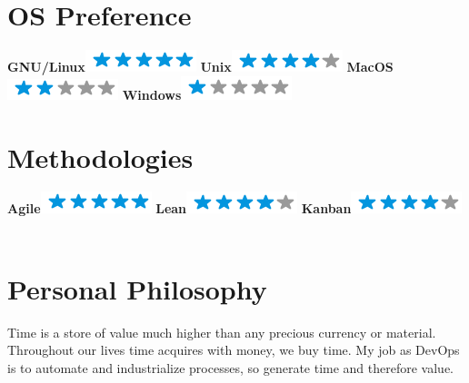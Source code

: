 \documentclass[]{friggeri-cv}
\begin{document}
\begin{aside}
    \section{OS Preference}
        \textbf{GNU/Linux}\includegraphics[scale=0.40]{img/5stars.png}
        \textbf{Unix}\includegraphics[scale=0.40]{img/4stars.png}
        \textbf{MacOS}\includegraphics[scale=0.40]{img/2stars.png}
        \textbf{Windows}\includegraphics[scale=0.40]{img/1stars.png}
        ~
    \section{Methodologies}
        \textbf{Agile}\includegraphics[scale=0.40]{img/5stars.png}
        \textbf{Lean}\includegraphics[scale=0.40]{img/4stars.png}
        \textbf{Kanban}\includegraphics[scale=0.40]{img/4stars.png}
        ~
\end{aside}

\section{Personal Philosophy}
    Time is a store of value much higher than any precious currency or material. Throughout our lives time acquires with money, we buy time.
    My job as DevOps is to automate and industrialize processes, so generate time and therefore value.
\end{document}
